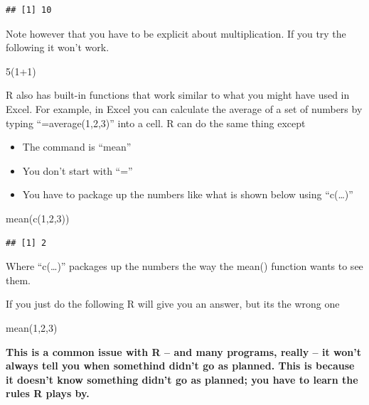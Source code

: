 \documentclass[
]{book}
\newenvironment{Shaded}{\begin{snugshade}}{\end{snugshade}}
\newcommand{\DecValTok}[1]{\textcolor[rgb]{0.00,0.00,0.81}{#1}}
\newcommand{\FunctionTok}[1]{\textcolor[rgb]{0.00,0.00,0.00}{#1}}
\newcommand{\NormalTok}[1]{#1}
\newcommand{\SpecialCharTok}[1]{\textcolor[rgb]{0.00,0.00,0.00}{#1}}
\providecommand{\tightlist}{%
  \setlength{\itemsep}{0pt}\setlength{\parskip}{0pt}}
\begin{document}
\begin{verbatim}
## [1] 10
\end{verbatim}

Note however that you have to be explicit about multiplication. If you try the following it won't work.

\begin{Shaded}
\begin{Highlighting}[]
\DecValTok{5}\NormalTok{(}\DecValTok{1}\SpecialCharTok{+}\DecValTok{1}\NormalTok{)}
\end{Highlighting}
\end{Shaded}

R also has built-in functions that work similar to what you might have used in Excel. For example, in Excel you can calculate the average of a set of numbers by typing ``=average(1,2,3)'' into a cell. R can do the same thing except

\begin{itemize}
\tightlist
\item
  The command is ``mean''
\item
  You don't start with ``=''
\item
  You have to package up the numbers like what is shown below using ``c(\ldots)''
\end{itemize}

\begin{Shaded}
\begin{Highlighting}[]
\FunctionTok{mean}\NormalTok{(}\FunctionTok{c}\NormalTok{(}\DecValTok{1}\NormalTok{,}\DecValTok{2}\NormalTok{,}\DecValTok{3}\NormalTok{))}
\end{Highlighting}
\end{Shaded}

\begin{verbatim}
## [1] 2
\end{verbatim}

Where ``c(\ldots)'' packages up the numbers the way the mean() function wants to see them.

If you just do the following R will give you an answer, but its the wrong one

\begin{Shaded}
\begin{Highlighting}[]
\FunctionTok{mean}\NormalTok{(}\DecValTok{1}\NormalTok{,}\DecValTok{2}\NormalTok{,}\DecValTok{3}\NormalTok{)}
\end{Highlighting}
\end{Shaded}

\textbf{This is a common issue with R -- and many programs, really -- it won't always tell you when somethind didn't go as planned. This is because it doesn't know something didn't go as planned; you have to learn the rules R plays by.}
\end{document}
